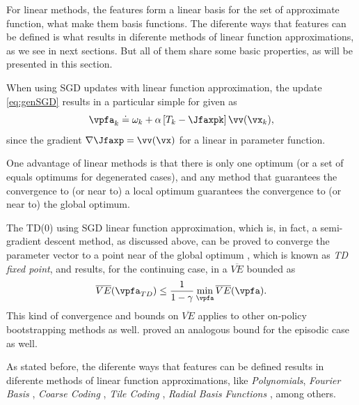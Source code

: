 For linear methods, the features form a linear basis for the set of approximate function, what make them basis functions. 
The diferente ways that features can be defined is what results in diferente methods of linear function approximations, as we see in next sections. But all of them share some basic properties, as will be presented in this section.

When using SGD updates with linear function approximation, the update \eqref{eq:genSGD} results in a particular simple for given as
\begin{equation}
  \vpfa_k \doteq \omega_k + \alpha \left[T_k - \Jfaxpk\right]\vv(\vx_k)
  \label{eq:lingenSGD},
\end{equation}
since the gradient $\nabla \Jfaxp = \vv(\vx)$ for a linear in parameter function.

One advantage of linear methods is that there is only one optimum (or a set of equals optimums for degenerated cases), and any method that guarantees the convergence to (or near to) a local optimum guarantees the convergence to (or near to) the global optimum.

The TD(0) using SGD linear function approximation, which is, in fact, a semi-gradient descent method, as discussed above, can be proved to converge the parameter vector to a point near of the global optimum   \citep{sutton1988}, which is known as  \textit{TD fixed point}, and results, for the continuing case, in a $ \overline{VE}$ bounded as
\begin{equation}
  \overline{VE}(\vpfa_{TD}) \le \frac{1}{1-\gamma} \min_{\vpfa}\overline{VE}(\vpfa)
  \label{eq:meanSquaredValueError}. 
\end{equation}
This kind of convergence and bounds on $\overline{VE}$ applies to other on-policy bootstrapping methods as well. \citet{bertsekas1996} proved an analogous bound for the episodic case as well.

As stated before, the diferente ways that features can be defined results in diferente methods of linear function approximations, like \textit{Polynomials}, \textit{Fourier Basis} \citep{konidaris2011}, \textit{Coarse Coding} \citep{hinton1984,waltz1965}, \textit{Tile Coding} \citep{albus1971,watkins1989}, \textit{Radial Basis Functions} \citep{powell1987}, among others.

